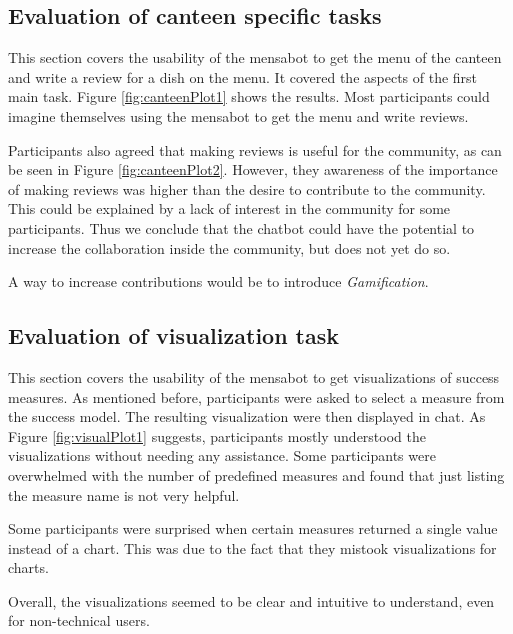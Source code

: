 \subsection{Evaluation of canteen specific tasks}  
This section covers the usability of the mensabot to get the menu of the canteen and write a review for a dish on the menu. It covered the aspects of the first main task. Figure \ref{fig:canteenPlot1} shows the results. Most participants could imagine themselves using the mensabot to get the menu and write reviews.
 
Participants also agreed that making reviews is useful for the community, as can be seen in Figure \ref{fig:canteenPlot2}. 
However, they awareness of the importance of making reviews was higher than the desire to contribute to the community. This could be explained by a lack of interest in the community for some participants.
Thus we conclude that the chatbot could have the potential to increase the collaboration inside the community, but does not yet do so. 

A way to increase contributions would be to introduce \emph{Gamification}. 

\subsection{Evaluation of visualization task}

This section covers the usability of the mensabot to get visualizations of success measures. As mentioned before, participants were asked to select a measure from the success model. The resulting visualization were then displayed in chat. As Figure \ref{fig:visualPlot1} suggests, participants mostly understood the visualizations without needing any assistance. Some participants were overwhelmed with the number of predefined measures and found that just listing the measure name is not very helpful. 

Some participants were surprised when certain measures returned a single value instead of a chart. This was due to the fact that they mistook visualizations for charts. 



Overall, the visualizations seemed to be clear and intuitive to understand, even for non-technical users.  

